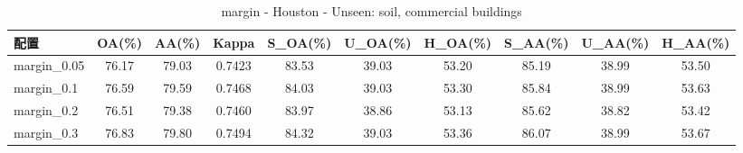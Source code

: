 \begin{table}[htbp]
\centering
\caption{margin - Houston - Unseen: soil, commercial buildings}
\begin{tabular}{lccccccccc}
\hline
配置 & OA(\%) & AA(\%) & Kappa & S\_OA(\%) & U\_OA(\%) & H\_OA(\%) & S\_AA(\%) & U\_AA(\%) & H\_AA(\%) \\
\hline
margin_0.05 & 76.17 & 79.03 & 0.7423 & 83.53 & 39.03 & 53.20 & 85.19 & 38.99 & 53.50 \\
margin_0.1 & 76.59 & 79.59 & 0.7468 & 84.03 & 39.03 & 53.30 & 85.84 & 38.99 & 53.63 \\
margin_0.2 & 76.51 & 79.38 & 0.7460 & 83.97 & 38.86 & 53.13 & 85.62 & 38.82 & 53.42 \\
margin_0.3 & 76.83 & 79.80 & 0.7494 & 84.32 & 39.03 & 53.36 & 86.07 & 38.99 & 53.67 \\
\hline
\end{tabular}
\end{table}
